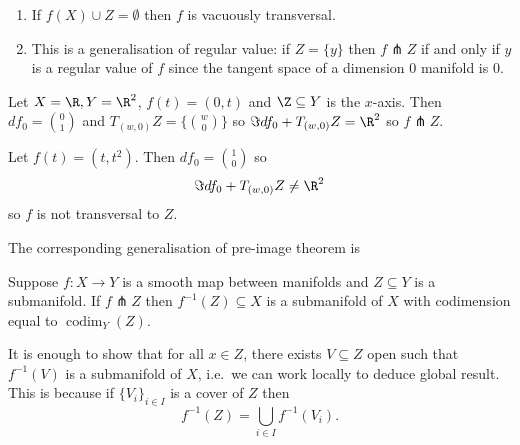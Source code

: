 \documentclass[a4paper]{article}
\DeclareMathOperator{\codim}{codim}
\begin{document}
\begin{remark}\leavevmode
  \begin{enumerate}
  \item If \(f(X) \cup Z = \emptyset\) then \(f\) is vacuously transversal.
  \item This is a generalisation of regular value: if \(Z = \{y\}\) then \(f \pitchfork Z\) if and only if \(y\) is a regular value of \(f\) since the tangent space of a dimension \(0\) manifold is \(0\).
  \end{enumerate}
\end{remark}

\begin{eg}
  Let \(X = \R, Y = \R^2\), \(f(t) = (0, t)\) and \(\Z \subseteq Y\) is the \(x\)-axis. Then \(df_0 = \binom{0}{1}\) and \(T_{(w, 0)}Z = \{\binom{w}{0}\}\) so \(\Im df_0 + T_{(w, 0)}Z = \R^2\) so \(f \pitchfork Z\).
\end{eg}

\begin{eg}
  Let \(f(t) = (t, t^2)\). Then \(df_0 = \binom{1}{0}\) so
  \[
    \Im df_0 + T_{(w, 0)}Z \neq \R^2
  \]
  so \(f\) is not transversal to \(Z\).
\end{eg}

The corresponding generalisation of pre-image theorem is

\begin{theorem}
  Suppose \(f: X \to Y\) is a smooth map between manifolds and \(Z \subseteq Y\) is a submanifold. If \(f \pitchfork Z\) then \(f^{-1}(Z) \subseteq X\) is a submanifold of \(X\) with codimension equal to \(\codim_Y(Z)\).
\end{theorem}

\begin{remark}
  It is enough to show that for all \(x \in Z\), there exists \(V \subseteq Z\) open such that \(f^{-1}(V)\) is a submanifold of \(X\), i.e.\ we can work locally to deduce global result. This is because if \(\{V_i\}_{i \in I}\) is a cover of \(Z\) then
  \[
    f^{-1}(Z) = \bigcup_{i \in I} f^{-1}(V_i).
  \]
\end{remark}
\end{document}
